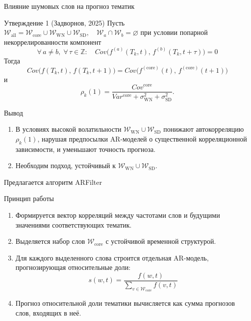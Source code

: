 \documentclass{beamer}
\begin{document}
\begin{frame}{Влияние шумовых слов на прогноз тематик}
\begin{block}{Утверждение 1 (Задворнов, 2025)}
\footnotesize
Пусть \(
\mathcal{W}_{\mathrm{all}} = \mathcal{W}_{\mathrm{core}} \cup \mathcal{W}_{\mathrm{WN}} \cup \mathcal{W}_{\mathrm{SD}}, \quad \mathcal{W}_a \cap \mathcal{W}_b = \varnothing
\)
при условии попарной некоррелированности компонент
\[
\forall\,a \neq b,\;\forall\,\tau \in \mathbb{Z}:\quad
Cov\bigl(f^{(a)}(T_k,t),\,f^{(b)}(T_k,t+\tau)\bigr) = 0
\]
Тогда
\[
Cov\bigl(f(T_k,t),\,f(T_k,t+1)\bigr) = Cov\bigl(f^{(\mathrm{core})}(t),\,f^{(\mathrm{core})}(t{+}1)\bigr)
\]
и
\[
\rho_k(1) = \frac{Cov^{\mathrm{core}}}{Var^{\mathrm{core}} + \sigma_{\mathrm{WN}}^2 + \sigma_{\mathrm{SD}}^2}.
\]
\normalsize
\end{block}

\vspace{-0.4cm}
\begin{block}{Вывод}
\begin{enumerate}
\item В условиях высокой волатильности $\mathcal{W}_{\mathrm{WN}} \cup \mathcal{W}_{\mathrm{SD}}$ понижают автокорреляцию $\rho_k(1)$, нарушая предпосылки AR-моделей о существенной корреляционной зависимости, и уменьшают точность прогноза. 
\item Необходим подход, устойчивый к $\mathcal{W}_{\mathrm{WN}}\cup\mathcal{W}_{\mathrm{SD}}$.
\end{enumerate}
\end{block}
\end{frame}

\begin{frame}{Предлагается алгоритм ARFilter}

\begin{block}{Принцип работы}
\begin{enumerate}
\item Формируется вектор корреляций между частотами слов и будущими значениями соответствующих тематик.  

\item Выделяется набор слов $\mathcal{W}_{\mathrm{core}}$ с устойчивой временной структурой.  

\item Для каждого выделенного слова строится отдельная AR-модель, прогнозирующая относительные доли:
\footnotesize
\[s(w,t) = \frac{f(w,t)}{\sum_{v\in\mathcal{W}_{\mathrm{core}}}f(v,t)}\]
\normalsize

\item Прогноз относительной доли тематики вычисляется как сумма прогнозов слов, входящих в неё.  


\end{enumerate}
\end{block}
\end{frame}
\end{document}
